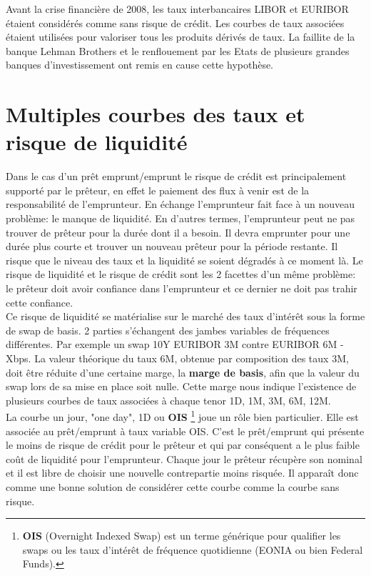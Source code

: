 \documentclass{article}
\begin{document}
Avant la crise financière de 2008, les taux interbancaires LIBOR et EURIBOR étaient considérés comme sans risque de crédit. Les courbes de taux associées étaient utilisées pour valoriser tous les produits dérivés de taux. La faillite de la banque Lehman Brothers et le renflouement par les Etats de plusieurs grandes banques d'investissement ont remis en cause cette hypothèse.\\

\section*{Multiples courbes des taux et risque de liquidité}

Dans le cas d’un prêt emprunt/emprunt le risque de crédit est principalement supporté par le prêteur, en effet le paiement des flux à venir est de la responsabilité de l’emprunteur. En échange l’emprunteur fait face à un nouveau problème: le manque de liquidité. En d’autres termes, l'emprunteur peut ne pas trouver de prêteur pour la durée dont il a besoin. Il devra emprunter pour une durée plus courte et trouver un nouveau prêteur pour la période restante. Il risque que le niveau des taux et la liquidité se soient dégradés à ce moment là. Le risque de liquidité et le risque de crédit sont les 2 facettes d’un même problème: le prêteur doit avoir confiance dans l’emprunteur et ce dernier ne doit pas trahir cette confiance.\\

Ce risque de liquidité se matérialise sur le marché des taux d’intérêt sous la forme de swap de basis. 2 parties s’échangent des jambes variables de fréquences différentes. Par exemple un swap 10Y EURIBOR 3M contre EURIBOR 6M - Xbps. La valeur théorique du taux 6M, obtenue par composition des taux 3M, doit être réduite d’une certaine marge, la \textbf{marge de basis}, afin que la valeur du swap lors de sa mise en place soit nulle. Cette marge nous indique l’existence de plusieurs courbes de taux associées à chaque tenor 1D, 1M, 3M, 6M, 12M.\\

La courbe un jour, "one day", 1D ou \textbf{OIS} \footnote{\textbf{OIS} (Overnight Indexed Swap) est un terme générique pour qualifier les swaps ou les taux d'intérêt de fréquence quotidienne (EONIA ou bien Federal Funds).} joue un rôle bien particulier. Elle est associée au prêt/emprunt à taux variable OIS. C’est le prêt/emprunt qui présente le moins de risque de crédit pour le prêteur et qui par conséquent a le plus faible coût de liquidité pour l’emprunteur. Chaque jour le prêteur récupère son nominal et il est libre de choisir une nouvelle contrepartie moins risquée. Il apparaît donc comme une bonne solution de considérer cette courbe comme la courbe sans risque.
\end{document}
